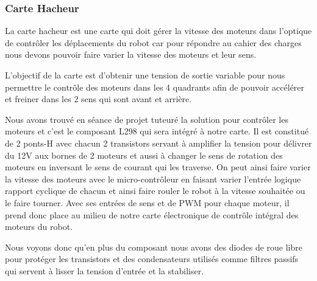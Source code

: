 \subsubsection{Carte Hacheur}
La carte hacheur est une carte qui doit gérer la vitesse des moteurs dans l’optique de contrôler les déplacements du robot car pour répondre au cahier des charges nous devons pouvoir faire varier la vitesse des moteurs et leur sens.


L’objectif de la carte est d’obtenir une tension de sortie variable pour nous permettre le contrôle des moteurs dans les 4 quadrants afin de pouvoir accélérer et freiner dans les 2 sens qui sont avant et arrière.


Nous avons trouvé en séance de projet tuteuré la solution pour contrôler les moteurs et c’est le composant L298 qui sera intégré à notre carte.
Il est constitué de 2 ponts-H avec chacun 2 transistors servant à amplifier la tension pour délivrer du 12V aux bornes de 2 moteurs et aussi à changer le sens de rotation des moteurs en inversant le sens de courant qui les traverse.
On peut ainsi faire varier la vitesse des moteurs avec le micro-contrôleur en faisant varier l’entrée logique rapport cyclique de chacun et ainsi faire rouler le robot à la vitesse souhaitée ou le faire tourner.
Avec ses entrées de sens et de PWM pour chaque moteur, il prend donc place au milieu de notre carte électronique de contrôle intégral des moteurs du robot.


Nous voyons donc qu’en plus du composant nous avons des diodes de roue libre pour protéger les transistors et des condensateurs utilisés comme filtres passifs qui servent à lisser la tension d’entrée et la stabiliser.


